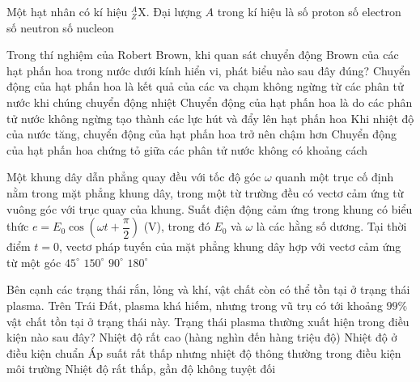 	\begin{ex}%
		Một hạt nhân có kí hiệu ${}^A_Z\text{X}$. Đại lượng $A$ trong kí hiệu là
		\choice
		{số proton}
		{số electron}
		{số neutron}
		{\True số nucleon}
	\end{ex}

	\begin{ex}%
		Trong thí nghiệm của Robert Brown, khi quan sát chuyển động Brown của các hạt phấn hoa trong nước dưới kính hiển vi, phát biểu nào sau đây đúng?
		\choice
		{\True Chuyển động của hạt phấn hoa là kết quả của các va chạm không ngừng từ các phân tử nước khi chúng chuyển động nhiệt}
		{Chuyển động của hạt phấn hoa là do các phân tử nước không ngừng tạo thành các lực hút và đẩy lên hạt phấn hoa}
		{Khi nhiệt độ của nước tăng, chuyển động của hạt phấn hoa trở nên chậm hơn}
		{Chuyển động của hạt phấn hoa chứng tỏ giữa các phân tử nước không có khoảng cách}
	\end{ex}

	\begin{ex}%
		Một khung dây dẫn phẳng quay đều với tốc độ góc $\omega$ quanh một trục cố định nằm trong mặt phẳng khung dây, trong một từ trường đều có vectơ cảm ứng từ vuông góc với trục quay của khung. Suất điện động cảm ứng trong khung có biểu thức $e=E_0\cos\left(\omega t+\dfrac{\pi}{2}\right)$ (V), trong đó $E_0$ và $\omega$ là các hằng số dương. Tại thời điểm $t=0$, vectơ pháp tuyến của mặt phẳng khung dây hợp với vectơ cảm ứng từ một góc
		\choice
		{$45^\circ$}
		{$150^\circ$}
		{$90^\circ$}
		{\True $180^\circ$}
	\end{ex}

	\begin{ex}%
		Bên cạnh các trạng thái rắn, lỏng và khí, vật chất còn có thể tồn tại ở trạng thái plasma. Trên Trái Đất, plasma khá hiếm, nhưng trong vũ trụ có tới khoảng $99\%$ vật chất tồn tại ở trạng thái này. Trạng thái plasma thường xuất hiện trong điều kiện nào sau đây?
		\choice
		{\True Nhiệt độ rất cao (hàng nghìn đến hàng triệu độ)}
		{Nhiệt độ ở điều kiện chuẩn}
		{Áp suất rất thấp nhưng nhiệt độ thông thường trong điều kiện môi trường}
		{Nhiệt độ rất thấp, gần độ không tuyệt đối}
	\end{ex}

